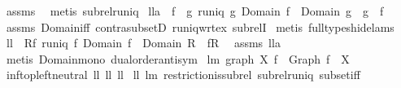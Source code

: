 \begin{isabellebody}
%
\isadelimproof
%
\endisadelimproof
%
\isatagproof
{}\isamarkupfalse%
\ assms\ \isamarkupfalse%
\ {\isacharparenleft}metis\ subrel{\isacharunderscore}runiq{\isacharparenright}%
\endisatagproof
{\isafoldproof}%
%
\isadelimproof
\isanewline
%
\endisadelimproof
\isanewline
{}\isamarkupfalse%
\ ll{}{}a{\isacharcolon}\ \ {\isachardoublequoteopen}f\ {\isasymsubseteq}\ g{\isachardoublequoteclose}\ {\isachardoublequoteopen}runiq\ g{\isachardoublequoteclose}\ {\isachardoublequoteopen}Domain\ f\ {\isacharequal}\ Domain\ g{\isachardoublequoteclose}\ \ {\isachardoublequoteopen}g\ {\isasymsubseteq}\ f{\isachardoublequoteclose}\isanewline
%
\isadelimproof
%
\endisadelimproof
%
\isatagproof
{}\isamarkupfalse%
\ assms\ Domain{\isacharunderscore}iff\ contra{\isacharunderscore}subsetD\ runiq{\isacharunderscore}wrt{\isacharunderscore}ex{}\ subrelI\isanewline
{}\isamarkupfalse%
\ {\isacharparenleft}metis\ {\isacharparenleft}full{\isacharunderscore}types{\isacharcomma}hide{\isacharunderscore}lams{\isacharparenright}{\isacharparenright}%
\endisatagproof
{\isafoldproof}%
%
\isadelimproof
\isanewline
%
\endisadelimproof
\isanewline
{}\isamarkupfalse%
\ ll{}{}{\isacharcolon}\ \ {\isachardoublequoteopen}R{\isasymsubseteq}f{\isachardoublequoteclose}\ {\isachardoublequoteopen}runiq\ f{\isachardoublequoteclose}\ {\isachardoublequoteopen}Domain\ f\ {\isasymsubseteq}\ Domain\ R{\isachardoublequoteclose}\ \ {\isachardoublequoteopen}f{\isacharequal}R{\isachardoublequoteclose}\ \isanewline
%
\isadelimproof
%
\endisadelimproof
%
\isatagproof
{}\isamarkupfalse%
\ assms\ ll{}{}a\ \isamarkupfalse%
\ {\isacharparenleft}metis\ Domain{\isacharunderscore}mono\ dual{\isacharunderscore}order{\isachardot}antisym{\isacharparenright}%
\endisatagproof
{\isafoldproof}%
%
\isadelimproof
\isanewline
%
\endisadelimproof
\isanewline
{}\isamarkupfalse%
\ lm{}{}{\isacharcolon}\ {\isachardoublequoteopen}graph\ X\ f\ {\isacharequal}\ Graph\ f\ {\isacharbar}{\isacharbar}\ X{\isachardoublequoteclose}%
\isadelimproof
\ %
\endisadelimproof
%
\isatagproof
{}\isamarkupfalse%
\ inf{\isacharunderscore}top{\isachardot}left{\isacharunderscore}neutral\ ll{}{}\ ll{}{}\ ll{}{}\ \isanewline
ll{}{}\ lm{}{}\ restriction{\isacharunderscore}is{\isacharunderscore}subrel\ subrel{\isacharunderscore}runiq\ subset{\isacharunderscore}iff\ \isamarkupfalse%

\end{isabellebody}
